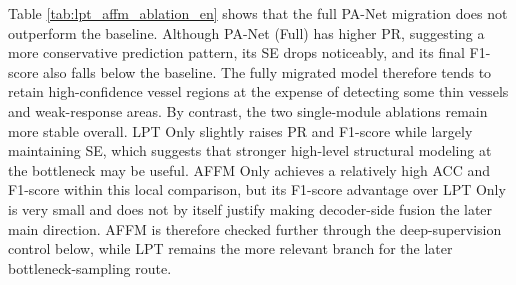 \documentclass[a4paper,11pt]{article}
\begin{document}
\begin{table}[!htbp]
\centering
\caption{Results of PA-Net module migration and ablation experiments}
\label{tab:lpt_affm_ablation_en}
\end{table}

Table \ref{tab:lpt_affm_ablation_en} shows that the full PA-Net migration does not outperform the baseline. Although PA-Net (Full) has higher PR, suggesting a more conservative prediction pattern, its SE drops noticeably, and its final F1-score also falls below the baseline. The fully migrated model therefore tends to retain high-confidence vessel regions at the expense of detecting some thin vessels and weak-response areas. By contrast, the two single-module ablations remain more stable overall. LPT Only slightly raises PR and F1-score while largely maintaining SE, which suggests that stronger high-level structural modeling at the bottleneck may be useful. AFFM Only achieves a relatively high ACC and F1-score within this local comparison, but its F1-score advantage over LPT Only is very small and does not by itself justify making decoder-side fusion the later main direction. AFFM is therefore checked further through the deep-supervision control below, while LPT remains the more relevant branch for the later bottleneck-sampling route.
\end{document}
